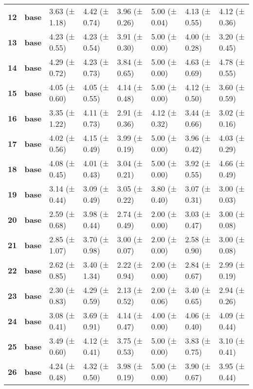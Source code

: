 \begin{longtable}{llllllll}
\cline{1-8}
\textbf{12} & \textbf{base} & 3.63 (± 1.18) & 4.42 (± 0.74) & 3.96 (± 0.26) & 5.00 (± 0.04) & 4.13 (± 0.55) & 4.12 (± 0.36) \\
\cline{1-8}
\textbf{13} & \textbf{base} & 4.23 (± 0.55) & 4.23 (± 0.54) & 3.91 (± 0.30) & 5.00 (± 0.00) & 4.00 (± 0.28) & 3.20 (± 0.45) \\
\cline{1-8}
\textbf{14} & \textbf{base} & 4.29 (± 0.72) & 4.23 (± 0.73) & 3.84 (± 0.65) & 5.00 (± 0.00) & 4.63 (± 0.69) & 4.78 (± 0.55) \\
\cline{1-8}
\textbf{15} & \textbf{base} & 4.05 (± 0.60) & 4.05 (± 0.55) & 4.14 (± 0.48) & 5.00 (± 0.00) & 4.12 (± 0.50) & 3.60 (± 0.59) \\
\cline{1-8}
\textbf{16} & \textbf{base} & 3.35 (± 1.22) & 4.11 (± 0.73) & 2.91 (± 0.36) & 4.12 (± 0.32) & 3.44 (± 0.66) & 3.02 (± 0.16) \\
\cline{1-8}
\textbf{17} & \textbf{base} & 4.02 (± 0.56) & 4.15 (± 0.49) & 3.99 (± 0.19) & 5.00 (± 0.00) & 3.96 (± 0.42) & 4.03 (± 0.29) \\
\cline{1-8}
\textbf{18} & \textbf{base} & 4.08 (± 0.45) & 4.01 (± 0.43) & 3.04 (± 0.21) & 5.00 (± 0.00) & 3.92 (± 0.55) & 4.66 (± 0.49) \\
\cline{1-8}
\textbf{19} & \textbf{base} & 3.14 (± 0.44) & 3.09 (± 0.49) & 3.05 (± 0.22) & 3.80 (± 0.40) & 3.07 (± 0.31) & 3.00 (± 0.03) \\
\cline{1-8}
\textbf{20} & \textbf{base} & 2.59 (± 0.68) & 3.98 (± 0.44) & 2.74 (± 0.49) & 2.00 (± 0.00) & 3.03 (± 0.47) & 3.00 (± 0.08) \\
\cline{1-8}
\textbf{21} & \textbf{base} & 2.85 (± 1.07) & 3.70 (± 0.98) & 3.00 (± 0.07) & 2.00 (± 0.00) & 2.58 (± 0.90) & 3.00 (± 0.08) \\
\cline{1-8}
\textbf{22} & \textbf{base} & 2.62 (± 0.85) & 3.40 (± 1.34) & 2.22 (± 0.94) & 2.00 (± 0.00) & 2.84 (± 0.67) & 2.99 (± 0.19) \\
\cline{1-8}
\textbf{23} & \textbf{base} & 2.30 (± 0.83) & 4.29 (± 0.59) & 2.13 (± 0.52) & 2.00 (± 0.06) & 3.40 (± 0.65) & 2.94 (± 0.26) \\
\cline{1-8}
\textbf{24} & \textbf{base} & 3.08 (± 0.41) & 3.69 (± 0.91) & 4.14 (± 0.47) & 4.00 (± 0.00) & 4.06 (± 0.40) & 4.09 (± 0.44) \\
\cline{1-8}
\textbf{25} & \textbf{base} & 3.49 (± 0.60) & 4.12 (± 0.41) & 3.75 (± 0.53) & 5.00 (± 0.00) & 3.83 (± 0.75) & 3.10 (± 0.41) \\
\cline{1-8}
\textbf{26} & \textbf{base} & 4.24 (± 0.48) & 4.32 (± 0.50) & 3.98 (± 0.19) & 5.00 (± 0.00) & 3.90 (± 0.67) & 3.95 (± 0.44) \\

\end{longtable}
